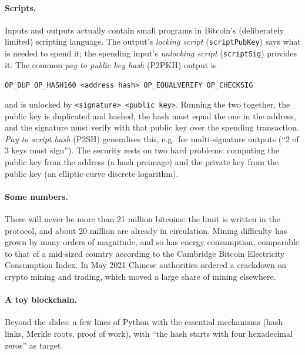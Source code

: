 \paragraph{Scripts.} Inputs and outputs actually contain small programs in Bitcoin's (deliberately limited) scripting language. The output's \emph{locking script} (\texttt{scriptPubKey}) says what is needed to spend it; the spending input's \emph{unlocking script} (\texttt{scriptSig}) provides it. The common \emph{pay to public key hash} (P2PKH) output is
\begin{center}
\small\texttt{OP\_DUP OP\_HASH160 <address hash> OP\_EQUALVERIFY OP\_CHECKSIG}
\end{center}
and is unlocked by \texttt{<signature> <public key>}. Running the two together, the public key is duplicated and hashed, the hash must equal the one in the address, and the signature must verify with that public key over the spending transaction. \emph{Pay to script hash} (P2SH) generalises this, e.g.\ for multi-signature outputs (\enquote{2 of 3 keys must sign}). The security rests on two hard problems: computing the public key from the address (a hash preimage) and the private key from the public key (an elliptic-curve discrete logarithm).

\paragraph{Some numbers.} There will never be more than 21 million bitcoins: the limit is written in the protocol, and about 20 million are already in circulation. Mining difficulty has grown by many orders of magnitude, and so has energy consumption, comparable to that of a mid-sized country according to the Cambridge Bitcoin Electricity Consumption Index. In May 2021 Chinese authorities ordered a crackdown on crypto mining and trading, which moved a large share of mining elsewhere.

\paragraph{A toy blockchain.} Beyond the slides: a few lines of Python with the essential mechanisms (hash links, Merkle roots, proof of work), with \enquote{the hash starts with four hexadecimal zeros} as target.

